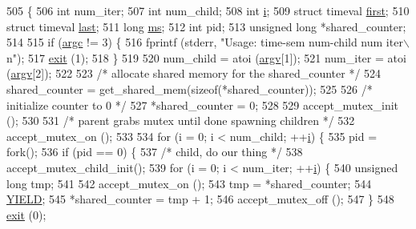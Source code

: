 \begin{DoxyCode}
505 \{
506     \textcolor{keywordtype}{int} num\_iter;
507     \textcolor{keywordtype}{int} num\_child;
508     \textcolor{keywordtype}{int} \hyperlink{group__MOD__PROXY_ga38403a0592eb8018a3ad61aef0f7ca2c}{i};
509     \textcolor{keyword}{struct }timeval \hyperlink{group__MOD__DAV_gae5e6e8bc4bfa800414992418716f96df}{first};
510     \textcolor{keyword}{struct }timeval \hyperlink{group__apr__strings_ga882d08c2e3ad3004cdfc219601ebaac8}{last};
511     \textcolor{keywordtype}{long} \hyperlink{group__APR__Util__MC_gabcfc3d1de80e72f78d877d87639acdd2}{ms};
512     \textcolor{keywordtype}{int} pid;
513     \textcolor{keywordtype}{unsigned} \textcolor{keywordtype}{long} *shared\_counter;
514 
515     \textcolor{keywordflow}{if} (\hyperlink{group__APACHE__CORE__LISTEN_ga073cc653debb351b563a84ac72c49614}{argc} != 3) \{
516         fprintf (stderr, \textcolor{stringliteral}{"Usage: time-sem num-child num iter\(\backslash\)n"});
517         \hyperlink{group__APACHE__OS__NETWARE_gaac7f3a566d7243651a356db3fcfef6b1}{exit} (1);
518     \}
519 
520     num\_child = atoi (\hyperlink{group__APACHE__CORE__LISTEN_ga7af4ef3a08f923773e59081c357d9adf}{argv}[1]);
521     num\_iter = atoi (\hyperlink{group__APACHE__CORE__LISTEN_ga7af4ef3a08f923773e59081c357d9adf}{argv}[2]);
522 
523     \textcolor{comment}{/* allocate shared memory for the shared\_counter */}
524     shared\_counter = get\_shared\_mem(\textcolor{keyword}{sizeof}(*shared\_counter));
525 
526     \textcolor{comment}{/* initialize counter to 0 */}
527     *shared\_counter = 0;
528 
529     accept\_mutex\_init ();
530 
531     \textcolor{comment}{/* parent grabs mutex until done spawning children */}
532     accept\_mutex\_on ();
533 
534     \textcolor{keywordflow}{for} (i = 0; i < num\_child; ++\hyperlink{group__MOD__PROXY_ga38403a0592eb8018a3ad61aef0f7ca2c}{i}) \{
535         pid = fork();
536         \textcolor{keywordflow}{if} (pid == 0) \{
537             \textcolor{comment}{/* child, do our thing */}
538             accept\_mutex\_child\_init();
539             \textcolor{keywordflow}{for} (i = 0; i < num\_iter; ++\hyperlink{group__MOD__PROXY_ga38403a0592eb8018a3ad61aef0f7ca2c}{i}) \{
540                 \textcolor{keywordtype}{unsigned} \textcolor{keywordtype}{long} tmp;
541 
542                 accept\_mutex\_on ();
543                 tmp = *shared\_counter;
544                 \hyperlink{time-sem_8c_a50d551776c26c1579754521287f0b0f0}{YIELD};
545                 *shared\_counter = tmp + 1;
546                 accept\_mutex\_off ();
547             \}
548             \hyperlink{group__APACHE__OS__NETWARE_gaac7f3a566d7243651a356db3fcfef6b1}{exit} (0);

\end{DoxyCode}
